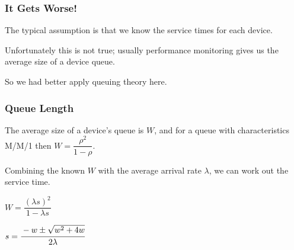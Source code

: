 \begin{frame}
\frametitle{It Gets Worse!}

The typical assumption is that we know the service times for each device. 

Unfortunately this is not true; usually performance monitoring gives us the average size of a device queue. 

So we had better apply queuing theory here.


\end{frame}



\begin{frame}
\frametitle{Queue Length}


The average size of a device's queue is $W$, and for a queue with characteristics M/M/1 then $W = \dfrac{\rho^{2}}{1-\rho}$. 

Combining the known $W$ with the average arrival rate $\lambda$, we can work out the service time. 

\begin{center}
$W = \dfrac{(\lambda s)^{2}}{1 - \lambda s}$


	$s = \cfrac{-w \pm \sqrt{w^{2}+4w}}{2\lambda}$
\end{center}



\end{frame}



